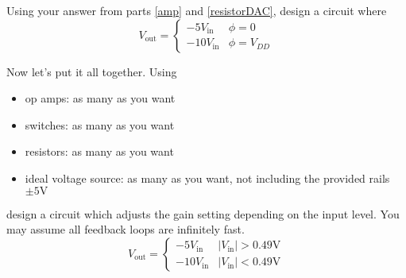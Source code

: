 \begin{enumerate}
\qitem\label{vga}{
	Using your answer from parts \ref{amp} and \ref{resistorDAC}, design a circuit where
	$$V_\text{out} = \begin{cases}
						-5V_\text{in} & \phi = 0\\
						-10V_\text{in} & \phi = V_{DD}
					\end{cases}$$
}

\qitem\label{agc}{
	Now let's put it all together. Using
	\begin{itemize}
		\item op amps: as many as you want
		\item switches: as many as you want
		\item resistors: as many as you want
		\item ideal voltage source: as many as you want, not including the provided rails $\pm 5\si{\volt}$
	\end{itemize}
	design a circuit which adjusts the gain setting depending on the input level. You may assume all feedback loops are infinitely fast.
	$$V_\text{out} = \begin{cases}
						-5V_\text{in} & |V_\text{in}| > 0.49\si{\volt}\\
						-10V_\text{in} & |V_\text{in}| < 0.49\si{\volt}
					\end{cases}$$
}
\end{enumerate}